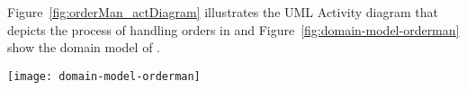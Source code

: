 Figure~\ref{fig:orderMan_actDiagram} illustrates the UML Activity diagram that depicts the process of handling orders in \orderman and Figure~\ref{fig:domain-model-orderman} show the domain model of \orderman.
\begin{figure*}[!ht]
	\centering
	\texttt{[image: domain-model-orderman]}
\vspace{-0.5cm}
	\caption{the domain model of the \orderman} %
	\label{fig:domain-model-orderman}
	\vspace{-0.3cm}
\end{figure*}

